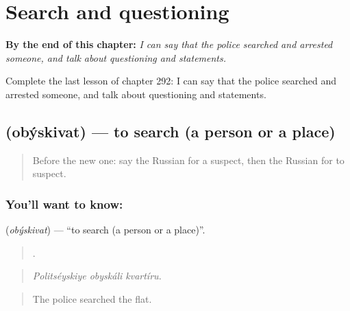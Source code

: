 
\chapter{Search and questioning}
\label{ch:ru-search-and-questioning}

\begin{chapteropening}
\textbf{By the end of this chapter:} \emph{I can say that the police searched and arrested someone, and talk about questioning and statements.}

Complete the last lesson of chapter 292: I can say that the police searched and arrested someone, and talk about questioning and statements.
\end{chapteropening}

\section[\texorpdfstring{\ru{обыскивать} (obýskivat)}{обыскивать (obýskivat)}]{ (obýskivat) — to search (a person or a place)}

\label{lesson:RU-C292-obyskivat}



\begin{quote}
Before the new one: say the Russian for a suspect, then the Russian for to suspect.
\end{quote}

\subsection*{You'll want to know: }
\textbf{} (\emph{obýskivat}) — \textquotedblleft{}to search (a person or a place)\textquotedblright{}.

\begin{quote}
  .
\end{quote}

\begin{quote}
\emph{Politséyskiye obyskáli kvartíru.}
\end{quote}

\begin{quote}
The police searched the flat.
\end{quote}

